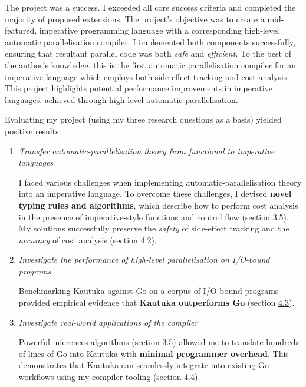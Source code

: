 \label{sec:5}

The project was a success. I exceeded all core success criteria and completed the majority of proposed extensions. The project's objective was to create a mid-featured, imperative programming language with a corresponding high-level automatic parallelisation compiler. I implemented both components successfully, ensuring that resultant parallel code was both \textit{safe} and \textit{efficient}. To the best of the author's knowledge, this is the first automatic parallelisation compiler for an imperative language which employs both side-effect tracking and cost analysis. This project highlights potential performance improvements in imperative languages, achieved through high-level automatic parallelisation.

Evaluating my project (using my three research questions as a basis) yielded positive results: 

\begin{enumerate}[leftmargin=8mm]
  \setlength{\itemindent}{-3mm}

  \item \textit{Transfer automatic-parallelisation theory from functional to imperative languages}

  I faced various challenges when implementing automatic-parallelisation theory into an imperative language. To overcome these challenges, I devised \textbf{novel typing rules and algorithms}, which describe how to perform cost analysis in the presence of imperative-style functions and control flow (section \hyperref[sec:3.5]{3.5}). My solutions successfully preserve the \textit{safety} of side-effect tracking and the \textit{accuracy} of cost analysis (section \hyperref[sec:4.2]{4.2}).

  \item \textit{Investigate the performance of high-level parallelisation on I/O-bound programs}
    
  Benchmarking Kautuka against Go on a corpus of I/O-bound programs provided empirical evidence that \textbf{Kautuka outperforms Go} (section \hyperref[sec:4.3]{4.3}).

  \item \textit{Investigate real-world applications of the compiler}
    
  Powerful inferences algorithms (section \hyperref[sec:3.5]{3.5}) allowed me to translate hundreds of lines of Go into Kautuka with \textbf{minimal programmer overhead}. This demonstrates that Kautuka can seamlessly integrate into existing Go workflows using my compiler tooling (section \hyperref[sec:4.4]{4.4}).
  
\end{enumerate}

